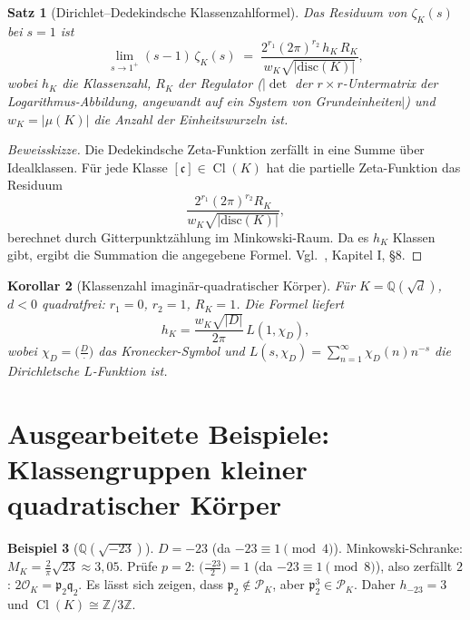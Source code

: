 \documentclass[12pt,a4paper]{amsart}
\newtheorem{theorem}{Satz}[section]
\newtheorem{corollary}[theorem]{Korollar}
\theoremstyle{definition}
\newtheorem{example}[theorem]{Beispiel}
\newcommand{\Z}{\mathbb{Z}}
\newcommand{\Q}{\mathbb{Q}}
\newcommand{\OK}{\mathcal{O}_K}
\newcommand{\p}{\mathfrak{p}}
\newcommand{\q}{\mathfrak{q}}
\newcommand{\disc}{\mathrm{disc}}
\DeclareMathOperator{\Cl}{Cl}
\begin{document}
\begin{theorem}[Dirichlet--Dedekindsche Klassenzahlformel]
\label{thm:klassenzahl}
Das Residuum von $\zeta_K(s)$ bei $s = 1$ ist
\[
  \lim_{s \to 1^+} (s-1)\,\zeta_K(s)
  \;=\;
  \frac{2^{r_1} (2\pi)^{r_2}\, h_K\, R_K}{w_K \sqrt{|\disc(K)|}},
\]
wobei $h_K$ die Klassenzahl, $R_K$ der \emph{Regulator}
($|\det$ der $r \times r$-Untermatrix der Logarithmus-Abbildung,
angewandt auf ein System von Grundeinheiten$|$)
und $w_K = |\mu(K)|$ die Anzahl der Einheitswurzeln ist.
\end{theorem}

\begin{proof}[Beweisskizze]
Die Dedekindsche Zeta-Funktion zerfällt in eine Summe über Idealklassen.
Für jede Klasse $[\mathfrak{c}] \in \Cl(K)$ hat die partielle Zeta-Funktion
das Residuum
\[
  \frac{2^{r_1}(2\pi)^{r_2} R_K}{w_K \sqrt{|\disc(K)|}},
\]
berechnet durch Gitterpunktzählung im Minkowski-Raum.
Da es $h_K$ Klassen gibt, ergibt die Summation die angegebene Formel.
Vgl.\ \cite{Neukirch1992}, Kapitel I, §8.
\end{proof}

\begin{corollary}[Klassenzahl imaginär-quadratischer Körper]
Für $K = \Q(\sqrt{d})$, $d < 0$ quadratfrei: $r_1 = 0$, $r_2 = 1$, $R_K = 1$.
Die Formel liefert
\[
  h_K = \frac{w_K \sqrt{|D|}}{2\pi}\, L(1, \chi_D),
\]
wobei $\chi_D = \bigl(\tfrac{D}{\cdot}\bigr)$ das Kronecker-Symbol und
$L(s, \chi_D) = \sum_{n=1}^\infty \chi_D(n) n^{-s}$ die Dirichletsche
$L$-Funktion ist.
\end{corollary}

\section{Ausgearbeitete Beispiele: Klassengruppen kleiner quadratischer Körper}

\begin{example}[$\Q(\sqrt{-23})$]
$D = -23$ (da $-23 \equiv 1 \pmod{4}$).  Minkowski-Schranke:
$M_K = \frac{2}{\pi}\sqrt{23} \approx 3{,}05$.
Prüfe $p = 2$: $\bigl(\tfrac{-23}{2}\bigr) = 1$ (da $-23 \equiv 1 \pmod 8$),
also zerfällt $2$: $2\OK = \p_2 \q_2$.
Es lässt sich zeigen, dass $\p_2 \notin \mathcal{P}_K$, aber
$\p_2^3 \in \mathcal{P}_K$.
Daher $h_{-23} = 3$ und $\Cl(K) \cong \Z/3\Z$.
\end{example}
\end{document}
